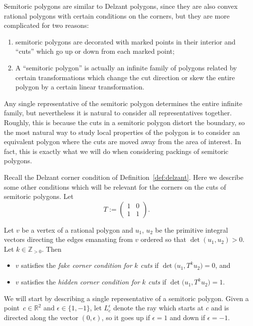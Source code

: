 \documentclass[10pt,a4paper]{amsart}
\numberwithin{equation}{section}
\def\R{{\mathbb R}}
\def\Z{{\mathbb Z}}
\theoremstyle{definition}
\theoremstyle{plain}
\theoremstyle{plain}
\begin{document}
Semitoric polygons are similar to Delzant polygons, since they are also convex rational polygons with certain conditions on the corners, but they are more complicated for two reasons:
\begin{enumerate}\itemsep=0pt
 \item[(1)] semitoric polygons are decorated with marked points in their interior and ``cuts'' which go up or down from each marked point;
 \item[(2)] A ``semitoric polygon'' is actually an infinite family of polygons related by certain transformations which change the cut direction or skew the entire polygon by a certain linear transformation.
\end{enumerate}
Any single representative of the semitoric polygon determines the entire infinite family, but nevertheless it is natural to consider all representatives together.
Roughly, this is because the cuts in a semitoric polygon distort the boundary, so the most natural way to study local properties of the polygon is to consider an equivalent polygon where the cuts are moved away from the area of interest. In fact, this is exactly what we will do when considering packings of semitoric polygons.

Recall the Delzant corner condition of Definition~\ref{def:delzant}. Here we describe some other conditions which will be relevant for the corners on the cuts of semitoric polygons.
Let
\begin{equation}\label{eqn:T}
T := \begin{pmatrix} 1 & 0 \\ 1 & 1 \end{pmatrix}.
\end{equation}

\begin{Definition}\label{def:fake_hidden}
Let $v$ be a vertex of a rational polygon and $u_1$, $u_2$ be the primitive integral vectors directing the edges emanating from $v$ ordered so that $\det (u_1, u_2) > 0$. Let $k\in\Z_{> 0}$. Then \begin{itemize}\itemsep=0pt
 \item $v$ satisfies the \emph{fake corner condition for $k$ cuts} if $\det \big(u_1,T^k u_2\big) = 0$, and
 \item $v$ satisfies the \emph{hidden corner condition for $k$ cuts} if $\det \big(u_1,T^k u_2\big) = 1$.
\end{itemize}
\end{Definition}

We will start by describing a single representative of a semitoric polygon.
Given a point~$c\in\R^2$ and $\epsilon\in\{1,-1\}$, let $L_c^\epsilon$ denote the ray which starts at $c$ and is directed along the vector $(0,\epsilon)$, so it goes up if $\epsilon=1$ and down if $\epsilon=-1$.
\end{document}
